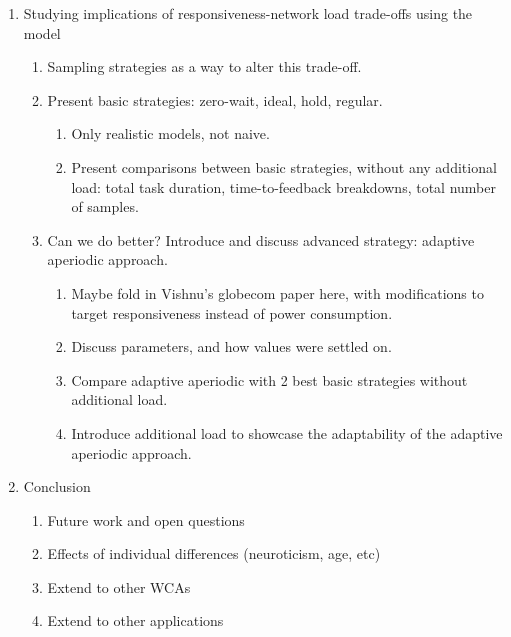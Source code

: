 \begin{enumerate}
    \item Studying implications of responsiveness-network load trade-offs using the model
    \begin{enumerate}
        \item Sampling strategies as a way to alter this trade-off.
        \item Present basic strategies: zero-wait, ideal, hold, regular.
        \begin{enumerate}
            \item Only realistic models, not naive.
            \item Present comparisons between basic strategies, without any additional load: total task duration, time-to-feedback breakdowns, total number of samples.
        \end{enumerate}
        \item Can we do better? Introduce and discuss advanced strategy: adaptive aperiodic approach.
        \begin{enumerate}
            \item Maybe fold in Vishnu's globecom paper here, with modifications to target responsiveness instead of power consumption.
            \item Discuss parameters, and how values were settled on.
            \item Compare adaptive aperiodic with 2 best basic strategies without additional load.
            \item Introduce additional load to showcase the adaptability of the adaptive aperiodic approach.
        \end{enumerate}
    \end{enumerate}
    \item Conclusion
    \begin{enumerate}
        \item Future work and open questions
        \item Effects of individual differences (neuroticism, age, etc)
        \item Extend to other WCAs
        \item Extend to other applications
    \end{enumerate}
\end{enumerate}
\newpage